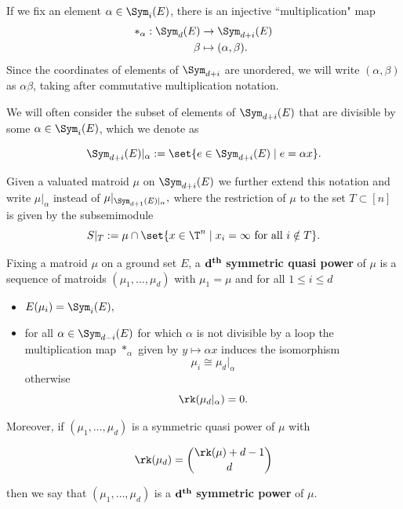 If we fix an element $\alpha \in \Sym_i(E)$, there is an injective ``multiplication" map
    \begin{align*}
        *_\alpha: \Sym_d(E)&\to \Sym_{d+i}(E)\\
        \beta&\mapsto (\alpha,\beta).
    \end{align*}
Since the coordinates of elements of $\Sym_{d+i}$ are unordered, we will write $(\alpha,\beta)$ as $\alpha\beta$, taking after commutative multiplication notation. 

We will often consider the subset of elements of $\Sym_{d+i}(E)$ that are divisible by some $\alpha\in \Sym_{i}(E)$, which we denote as

$$\Sym_{d+i}(E)|_{\alpha} := \set{e\in \Sym_{d+i}(E)\mid e= \alpha x}.$$

Given a valuated matroid $\mu$ on $\Sym_{d+i}(E)$ we further extend this notation and write $\mu|_{\alpha}$ instead of $\mu|_{\Sym_{d+1}(E)|_{\alpha}},$ where the restriction of $\mu$ to the set $T\subset [n]$ is given by the subsemimodule 
$$S|_T:=\mu\cap \set{x\in \T^n \mid x_i=\infty \text{ for all } i\notin T}.$$

\begin{definition}\label{def:symprod}
Fixing a matroid $\mu$ on a ground set $E$, a $\mathbf{d}^{\text{\textbf{th}}}$ \textbf{symmetric quasi power} of $\mu$ is a sequence of matroids $(\mu_1,\dots,\mu_d)$ with $\mu_1 = \mu$ and for all $1\leq i \leq d$
\begin{itemize}
    \item $E(\mu_i) = \Sym_i(E),$
    \item for all $\alpha\in \Sym_{d-i}(E)$ for which $\alpha$ is not divisible by a loop the multiplication map $*_\alpha$ given by $y\mapsto \alpha x$ induces the isomorphism
    \begin{equation}\label{eqn:symprodEmbedding} 
        \mu_i\cong \mu_d|_{\alpha}
    \end{equation}
    otherwise
    \begin{equation}\label{eqn:symprodLoops}
        \rk(\mu_d|_{\alpha})=0.
    \end{equation}
    
\end{itemize} 
Moreover, if $(\mu_1,\dots,\mu_d)$ is a symmetric quasi power of $\mu$ with

\begin{equation}\label{eqn:symprodRank}
\rk(\mu_d)= \binom{\rk(\mu)+d-1}{d}
\end{equation}

then we say that $(\mu_1,\dots,\mu_d)$ is a $\mathbf{d}^{\text{\textbf{th}}}$ \textbf{symmetric power} of $\mu$.
\end{definition}

